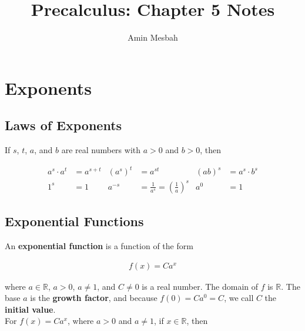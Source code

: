 \documentclass[
12pt, %
letterpaper, %
fleqn, %
notitlepage %
]{article}
\numberwithin{equation}{section} %
\numberwithin{figure}{section} %
\numberwithin{table}{section} %
\begin{document}
\title{\vspace{-2cm}Precalculus: Chapter 5 Notes}
\author{Amin Mesbah}
\date{}
\maketitle


\section{Exponents}


\subsection*{Laws of Exponents} %
If $s$, $t$, $a$, and $b$ are real numbers with $a>0$ and $b>0$, then

\begin{align}
	a^s \cdot a^t &= a^{s+t} &(a^s)^t &= a^{st} & (ab)^s &= a^s \cdot b^s \\
	1^s &= 1 & a^{-s} &= \frac{1}{a^s} = \left(\frac{1}{a}\right)^s & a^0 &= 1 
\end{align}


\subsection*{Exponential Functions}
An \textbf{exponential function} is a function of the form

\begin{align}
	f(x) = Ca^x
\end{align}

where $a \in \mathbb{R}$, $a>0$, $a\neq1$, and $C\neq0$ is a real number. The domain of $f$ is $\mathbb{R}$. The base $a$ is the \textbf{growth factor}, and because $f(0) = Ca^0 = C$, we call $C$ the \textbf{initial value}.\\

For $f(x)=Ca^x$, where $a>0$ and $a\neq1$, if $x\in\mathbb{R}$, then
\end{document}
